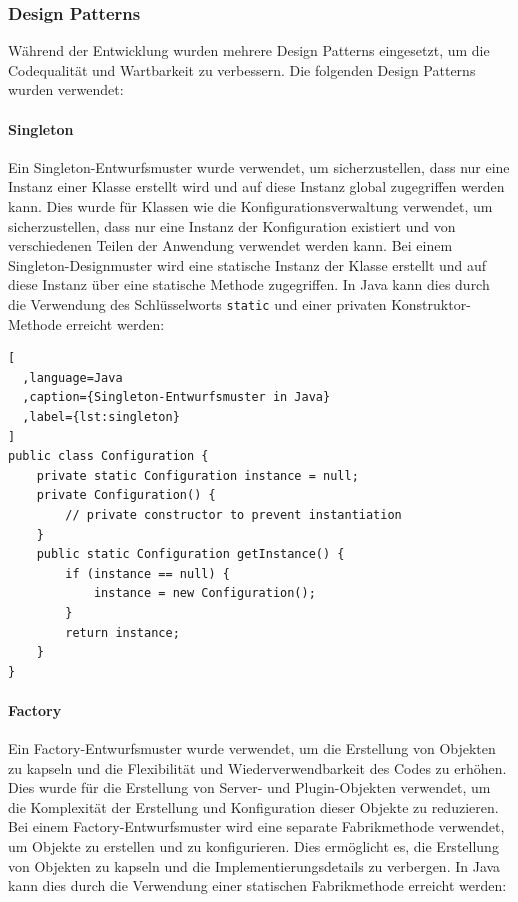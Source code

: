 \subsubsection{Design Patterns}\label{design-patterns}

Während der Entwicklung wurden mehrere \gls{Design Patterns} eingesetzt, um die Codequalität und Wartbarkeit zu verbessern. Die folgenden Design Patterns wurden verwendet:

\paragraph{Singleton}\label{singleton} Ein Singleton-Entwurfsmuster wurde verwendet, um sicherzustellen, dass nur eine Instanz einer Klasse erstellt wird und auf diese Instanz global zugegriffen werden kann. Dies wurde für Klassen wie die Konfigurationsverwaltung verwendet, um sicherzustellen, dass nur eine Instanz der Konfiguration existiert und von verschiedenen Teilen der Anwendung verwendet werden kann. Bei einem Singleton-Designmuster wird eine statische Instanz der Klasse erstellt und auf diese Instanz über eine statische Methode zugegriffen. In Java kann dies durch die Verwendung des Schlüsselworts \texttt{static} und einer privaten Konstruktor-Methode erreicht werden:

\begin{lstlisting}[
  ,language=Java
  ,caption={Singleton-Entwurfsmuster in Java}
  ,label={lst:singleton}
]
public class Configuration {
    private static Configuration instance = null;
    private Configuration() {
        // private constructor to prevent instantiation
    }
    public static Configuration getInstance() {
        if (instance == null) {
            instance = new Configuration();
        }
        return instance;
    }
}
\end{lstlisting}

\paragraph{Factory}\label{factory} Ein Factory-Entwurfsmuster wurde verwendet, um die Erstellung von Objekten zu kapseln und die Flexibilität und Wiederverwendbarkeit des Codes zu erhöhen. Dies wurde für die Erstellung von Server- und Plugin-Objekten verwendet, um die Komplexität der Erstellung und Konfiguration dieser Objekte zu reduzieren. Bei einem Factory-Entwurfsmuster wird eine separate Fabrikmethode verwendet, um Objekte zu erstellen und zu konfigurieren. Dies ermöglicht es, die Erstellung von Objekten zu kapseln und die Implementierungsdetails zu verbergen. In Java kann dies durch die Verwendung einer statischen Fabrikmethode erreicht werden:

